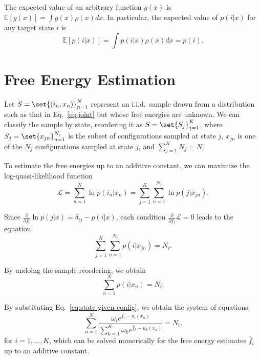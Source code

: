 \documentclass[layout=twocolumn]{achemso}
\DeclarePairedDelimiter\set\{\}
\newcommand{\diff}[2]{\frac{\partial{#1}}{\partial{#2}}} %
\begin{document}
The expected value of an arbitrary function $g(x)$ is $\mathbb{E}[g(x)] = \int g(x) \rho(x) dx$.
In particular, the expected value of $p(i|x)$ for any target state $i$ is
\begin{equation}
    \label{eq:expectation}
    \mathbb{E}\left[p(i|x)\right] = \int p(i|x) \rho(x) dx = p(i).
\end{equation}

\section{\label{sec:free energy}Free Energy Estimation}

Let $S = \set{(i_n, x_n)}_{n=1}^N$ represent an i.i.d.~sample drawn from a distribution such as that in Eq.~\eqref{eq:joint} but whose free energies are unknown.
We can classify the sample by state, reordering it as $S = \set{S_j}_{j=1}^K$, where $S_j = \set{x_{jn}}_{n=1}^{N_j}$ is the subset of configurations sampled at state $j$, $x_{jn}$ is one of the $N_j$ configurations sampled at state $j$, and $\sum_{j=1}^K N_j = N$.

To estimate the free energies up to an additive constant, we can maximize the log-quasi-likelihood function~\cite{Doss_2014}
\begin{equation}
    \label{eq:log-quasi-likelihood}
    \mathcal{L} = \sum_{n=1}^N \ln p(i_n|x_n)
    = \sum_{j=1}^K \sum_{n=1}^{N_j} \ln p(j|x_{jn}).
\end{equation}

Since $\diff{}{f_i} \ln p(j|x) = \delta_{ij} - p(i|x)$, each condition $\diff{}{f_i} \mathcal{L} = 0$ leads to the equation
\begin{equation}
    \sum_{j=1}^K \sum_{n=1}^{N_j} p(i|x_{jn}) = N_i.
\end{equation}

By undoing the sample reordering, we obtain
\begin{equation}
    \label{eq:maximum quasi-likelihood system}
    \sum_{n=1}^N p(i|x_n) = N_i.
\end{equation}

By substituting Eq.~\eqref{eq:state given config}, we obtain the system of equations
\begin{equation}
    \label{eq:free energy estimators}
    \sum_{n=1}^N \frac{
        \omega_i e^{\hat f_i - u_i(x_n)}
    }{
        \sum_{k=1}^K \omega_k e^{\hat f_k - u_k(x_n)}
    } = N_i.
\end{equation}
for $i=1,\dots,K$, which can be solved numerically for the free energy estimates $\hat f_i$ up to an additive constant.
\end{document}
